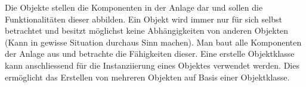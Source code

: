 Die Objekte stellen die Komponenten in der Anlage dar und sollen die Funktionalitäten dieser abbilden. Ein Objekt wird immer nur für sich selbst betrachtet und besitzt möglichst keine Abhängigkeiten von anderen Objekten (Kann in gewisse Situation durchaus Sinn machen). Man baut alle Komponenten der Anlage aus und betrachte die Fähigkeiten dieser. Eine erstelle Objektklasse kann anschliessend für die Instanziierung eines Objektes verwendet werden. Dies ermöglicht das Erstellen von mehreren Objekten auf Basis einer Objektklasse. 